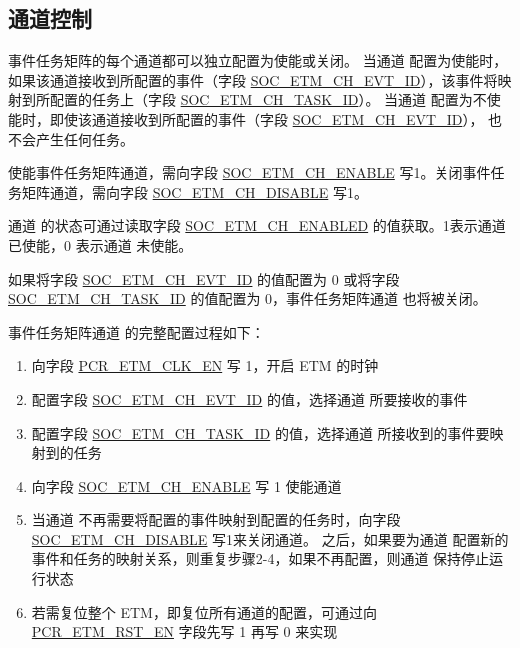 \documentclass[main\_\_CN.tex]{subfiles}
\begin{document}
\subsection{通道控制}
\label{sec:evntaskmatrix-channel-enable}

事件任务矩阵的每个通道都可以独立配置为使能或关闭。 当通道 配置为使能时，如果该通道接收到所配置的事件（字段 \hyperref[fielddesc:SOCETMCH0EVTID]{SOC\_ETM\_CH\_EVT\_ID}），该事件将映射到所配置的任务上（字段 \hyperref[fielddesc:SOCETMCH0TASKID]{SOC\_ETM\_CH\_TASK\_ID}）。 当通道 配置为不使能时，即使该通道接收到所配置的事件（字段 \hyperref[fielddesc:SOCETMCH0EVTID]{SOC\_ETM\_CH\_EVT\_ID}）， 也不会产生任何任务。

使能事件任务矩阵通道，需向字段 \hyperref[fielddesc:SOCETMCHENABLE0]{SOC\_ETM\_CH\_ENABLE} 写1。关闭事件任务矩阵通道，需向字段 \hyperref[fielddesc:SOCETMCHDISABLE0]{SOC\_ETM\_CH\_DISABLE} 写1。

通道 的状态可通过读取字段 \hyperref[fielddesc:SOCETMCHENABLED0]{SOC\_ETM\_CH\_ENABLED} 的值获取。1表示通道 已使能，0 表示通道 未使能。

如果将字段 \hyperref[fielddesc:SOCETMCH0EVTID]{SOC\_ETM\_CH\_EVT\_ID} 的值配置为 0 或将字段 \hyperref[fielddesc:SOCETMCH0TASKID]{SOC\_ETM\_CH\_TASK\_ID} 的值配置为 0，事件任务矩阵通道 也将被关闭。

事件任务矩阵通道 的完整配置过程如下：
\begin{enumerate}
    \item 向字段 \hyperref[fielddesc:PCRETMCLKEN]{PCR\_ETM\_CLK\_EN} 写 1，开启 ETM 的时钟
    \item 配置字段 \hyperref[fielddesc:SOCETMCH0EVTID]{SOC\_ETM\_CH\_EVT\_ID} 的值，选择通道 所要接收的事件
    \item 配置字段 \hyperref[fielddesc:SOCETMCH0TASKID]{SOC\_ETM\_CH\_TASK\_ID} 的值，选择通道 所接收到的事件要映射到的任务
    \item 向字段 \hyperref[fielddesc:SOCETMCHENABLE0]{SOC\_ETM\_CH\_ENABLE} 写 1 使能通道
    \item 当通道 不再需要将配置的事件映射到配置的任务时，向字段 \hyperref[fielddesc:SOCETMCHDISABLE0]{SOC\_ETM\_CH\_DISABLE} 写1来关闭通道。 之后，如果要为通道 配置新的事件和任务的映射关系，则重复步骤2-4，如果不再配置，则通道 保持停止运行状态
    \item 若需复位整个 ETM，即复位所有通道的配置，可通过向 \hyperref[fielddesc:PCRETMRSTEN]{PCR\_ETM\_RST\_EN} 字段先写 1 再写 0 来实现
\end{enumerate}
\end{document}
